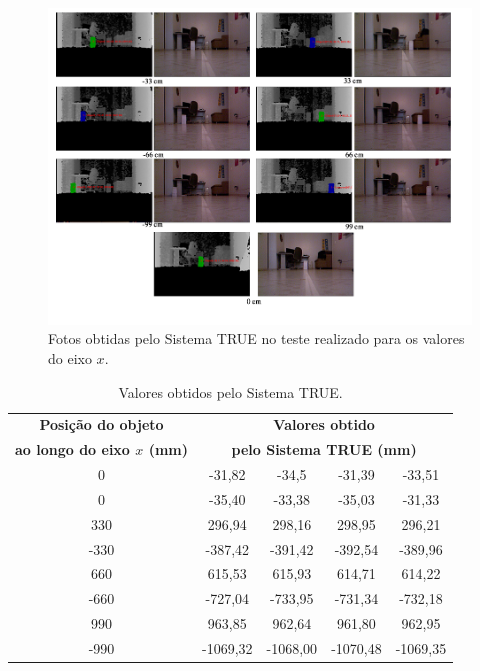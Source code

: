 	\begin{figure}[htb]
		\begin{center}
			\includegraphics[scale=0.55]{figuras/5.Testes/eixox-imgs.png}
		\end{center}
		\caption{Fotos obtidas pelo Sistema TRUE no teste realizado para os valores do eixo $\displaystyle x$.}
		\label{fig:eixox-imgs}
	\end{figure}

	\begin{table}[h]
		\begin{center}
			\caption{Valores obtidos pelo Sistema TRUE.}
			\begin{tabular}{|c|c|c|c|c|}
				\hline \bf Posição do objeto & \multicolumn{4}{|c|}{\bf Valores obtido}\\
							 \bf ao longo do eixo $\displaystyle x$ (mm) & \multicolumn{4}{|c|}{\bf pelo Sistema TRUE (mm)}\\
				\hline
				\hline 0    & -31,82   & -34,5    & -31,39   & -33,51 \\
				\hline 0    & -35,40   & -33,38   & -35,03   & -31,33  \\
				\hline 330  & 296,94   & 298,16   & 298,95   & 296,21 \\
				\hline -330 & -387,42  & -391,42  & -392,54  & -389,96 \\
				\hline 660  & 615,53   & 615,93   & 614,71   & 614,22 \\
				\hline -660 & -727,04  & -733,95  & -731,34  & -732,18 \\
				\hline 990  & 963,85   & 962,64   & 961,80   & 962,95 \\
				\hline -990 & -1069,32 & -1068,00 & -1070,48 & -1069,35 \\
				\hline
			\end{tabular}
		\end{center}
		\label{tab:valores-x}
	\end{table}

